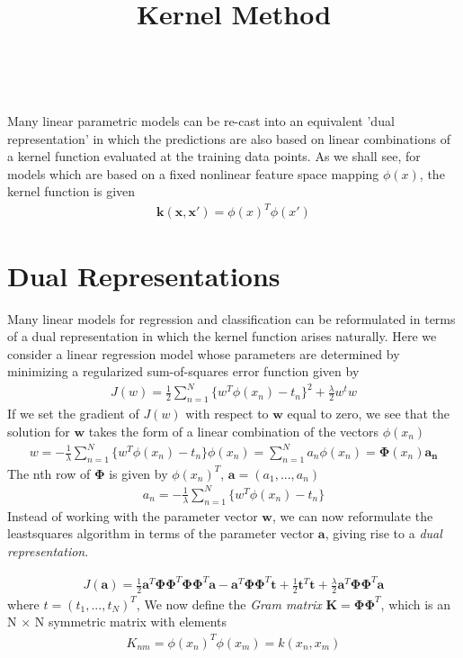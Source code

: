 \documentclass[a4paper]{article}
\begin{document}
\title{Kernel Method}
\author{}
\maketitle

Many linear parametric models can be re-cast into an equivalent
 'dual representation' in which the predictions are also based on linear
 combinations of a kernel function evaluated at the training data points.
As we shall see, for models which are based on a fixed nonlinear feature
 space mapping $\phi(x)$, the kernel function is given
\begin{align}
\mathbf{k}(\mathbf{x}, \mathbf{x'}) = \phi(x)^T\phi(x')
\end{align}

\section{Dual Representations}
Many linear models for regression and classification can be reformulated in terms of
 a dual representation in which the kernel function arises naturally.
Here we consider a linear regression model whose parameters are determined by
minimizing a regularized sum-of-squares error function given by
\begin{align}
J(w) = \frac{1}{2} \sum_{n=1}^{N} \{ w^T\phi(x_n) -t_n \}^2 + \frac{\lambda}{2}w^tw
\end{align}
If we set the gradient of $J(w)$ with respect to $\mathbf{w}$ equal to zero,
 we see that the solution for $\mathbf{w}$ takes the form of a linear
 combination of the vectors $\phi(x_n)$
\begin{align}
w = -\frac{1}{\lambda} \sum_{n=1}^{N} \{ w^T\phi(x_n) -t_n \}\phi(x_n)
  = \sum_{n=1}^Na_n\phi(x_n) = \mathbf{\Phi}(x_n)\mathbf{a_n}
\end{align}
The nth row of $\mathbf{\Phi}$ is given by $\phi(x_n)^T$, $\mathbf{a}
= (a_1,...,a_n)$
\begin{align}
a_n = -\frac{1}{\lambda} \sum_{n=1}^{N} \{ w^T\phi(x_n) -t_n \}
\end{align}
Instead of working with the parameter vector $\mathbf{w}$, we can now
 reformulate the leastsquares algorithm in terms of the parameter vector
 $\mathbf{a}$, giving rise to a \textit{dual representation}.

\begin{align}
J(\mathbf{a}) = \frac{1}{2} \mathbf{a}^T \mathbf{\Phi} \mathbf{\Phi}^T
  \mathbf{\Phi} \mathbf{\Phi}^T \mathbf{a} - \mathbf{a}^T
  \mathbf{\Phi} \mathbf{\Phi}^T \mathbf{t} + \frac{1}{2} \mathbf{t}^T
  \mathbf{t} + \frac{\lambda}{2} \mathbf{a}^T \mathbf{\Phi}
  \mathbf{\Phi}^T \mathbf{a}
\end{align}
where $t = (t_1,...,t_N)^T$, We now define the \textit{Gram matrix}
$\mathbf{K} = \mathbf{\Phi} \mathbf{\Phi}^T$, which is an N × N symmetric matrix with elements
\begin{align}
\mathit{K}_{nm} = \phi(x_n)^T\phi(x_m) = k(x_n, x_m)
\end{align}
\end{document}
